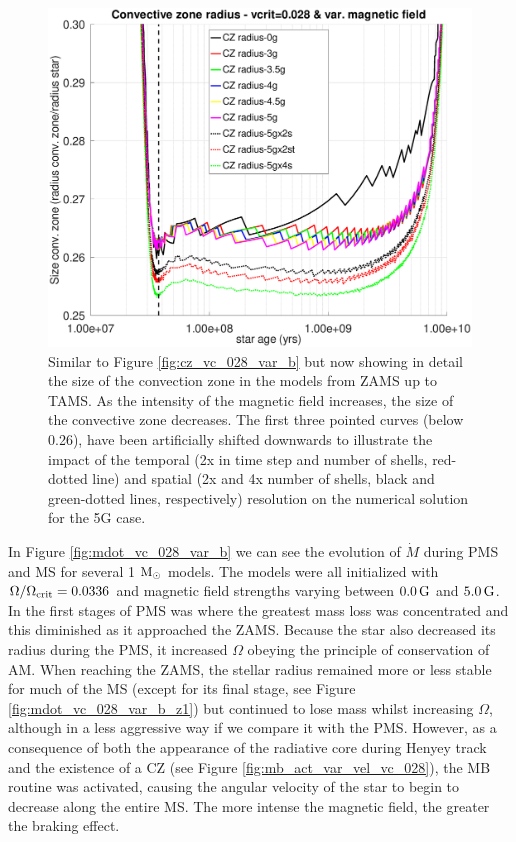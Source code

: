 \documentclass[fleqn,usenatbib]{mnras}
\begin{document}
\begin{figure}
	\includegraphics[trim = 15mm 10mm 15mm 10mm, clip,width=\columnwidth]{figures/cz_vc_028_var_g_z1_new.eps}
    \caption{Similar to Figure \ref{fig:cz_vc_028_var_b} but now showing in detail the size of the convection zone in the models from ZAMS up to TAMS. As the intensity of the magnetic field increases, the size of the convective zone decreases. The first three pointed curves (below 0.26), have been artificially shifted downwards to illustrate the impact of the temporal (2x in time step and number of shells, red-dotted line) and spatial (2x and 4x number of shells, black and green-dotted lines, respectively) resolution on the numerical solution for the 5G case.}
    \label{fig:cz_vc_028_var_b_z1_new}
\end{figure}


In Figure \ref{fig:mdot_vc_028_var_b} we can see the evolution of $\Dot{M}$ during PMS and MS for several 1 $\mathrm{M}_\odot$ models. The models were all initialized with $\Omega / \Omega_{\mathrm{crit}}=0.0336$ and magnetic field strengths varying between $0.0\,\mathrm{G}$ and $5.0\,\mathrm{G}$. In the first stages of PMS was where the greatest mass loss was concentrated and this diminished as it approached the ZAMS. Because the star also decreased its radius during the PMS, it increased $\Omega$ obeying the principle of conservation of AM. When reaching the ZAMS, the stellar radius remained more or less stable for much of the MS (except for its final stage, see Figure \ref{fig:mdot_vc_028_var_b_z1}) but continued to lose mass whilst increasing $\Omega$, although in a less aggressive way if we compare it with the PMS. However, as a consequence of both the appearance of the radiative core during Henyey track and the existence of a CZ (see Figure \ref{fig:mb_act_var_vel_vc_028}), the MB routine was activated, causing the angular velocity of the star to begin to decrease along the entire MS. The more intense the magnetic field, the greater the braking effect.\par 
\end{document}
